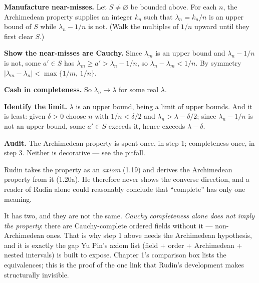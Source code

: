 \begin{proofwalk}
  \item \textbf{Manufacture near-misses.} Let $S \ne \varnothing$ be bounded
        above. For each $n$, the Archimedean property supplies an integer
        $k_n$ such that $\lambda_n = k_n/n$ is an upper bound of $S$ while
        $\lambda_n - 1/n$ is not. (Walk the multiples of $1/n$ upward until
        they first clear $S$.)
  \item \textbf{Show the near-misses are Cauchy.} Since $\lambda_m$ is an
        upper bound and $\lambda_n - 1/n$ is not, some $a' \in S$ has
        $\lambda_m \ge a' > \lambda_n - 1/n$, so
        $\lambda_n - \lambda_m < 1/n$. By symmetry
        $|\lambda_m - \lambda_n| < \max\{1/m,\,1/n\}$.
  \item \textbf{Cash in completeness.} So $\lambda_n \to \lambda$ for some
        real $\lambda$.
  \item \textbf{Identify the limit.} $\lambda$ is an upper bound, being a
        limit of upper bounds. And it is least: given $\delta>0$ choose $n$
        with $1/n < \delta/2$ and $\lambda_n > \lambda - \delta/2$; since
        $\lambda_n - 1/n$ is not an upper bound, some $a' \in S$ exceeds it,
        hence exceeds $\lambda - \delta$.
  \item \textbf{Audit.} The Archimedean property is spent once, in step 1;
        completeness once, in step 3. Neither is decorative --- see the
        pitfall.
\end{proofwalk}

\begin{deeper}
Rudin takes the \lub{} property as an \emph{axiom} (1.19) and derives the
Archimedean property from it (1.20a). He therefore never shows the converse
direction, and a reader of Rudin alone could reasonably conclude that
``complete'' has only one meaning.

It has two, and they are not the same. \emph{Cauchy completeness alone does
not imply the \lub{} property}: there are Cauchy-complete ordered fields
without it --- non-Archimedean ones. That is why step 1 above needs the
Archimedean hypothesis, and it is exactly the gap Yu Pin's axiom list
(field + order + Archimedean + nested intervals) is built to expose.
Chapter 1's comparison box lists the equivalences; this is the proof of the
one link that Rudin's development makes structurally invisible.
\end{deeper}

